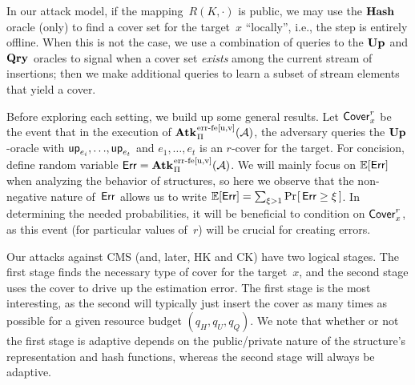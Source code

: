\noindent
In our attack model, if the mapping~$R(K,\cdot)$ is public, we may use the $\textup{\textbf{Hash}}\hspace{0.5pt}$ oracle (only) to find a cover set for the target~$x$ ``locally'', i.e., the step is entirely offline.  When this is not the case, we use a combination of queries to the $\textup{\textbf{Up}}\hspace{0.5pt}$ and $\textup{\textbf{Qry}}\hspace{0.5pt}$ oracles to signal when a cover set \emph{exists} among the current stream of insertions; then we make additional queries to learn a subset of stream elements that yield a cover. 

Before exploring each setting, we build up some general results. 
Let $\mathsf{Cover}^{r}_{x}$ be the event that in the execution of $\ExpErrFe{\struct}{\advA}{u,v}$, the adversary queries the $\textup{\textbf{Up}}\hspace{0.5pt}$-oracle with $\mathsf{up}_{e_i},{\dots},\mathsf{up}_{e_t}$ and $e_1,{\dots},e_t$ is an $r$-cover for the target.  For concision, define random variable $\rverr=\ExpErrFe{\struct}{\advA}{u,v}$.  We will mainly focus on $\mathbb{E}[\mathsf{Err}]$ when analyzing the behavior of structures, so here we observe that the non-negative nature of~$\mathsf{Err}$ allows us to write $\mathbb{E}[\mathsf{Err}]=\sum_{\xi > 1} \Pr\hspace{-1pt}\left[\,\mathsf{Err} \geq \xi\,\right]$.  In determining the needed probabilities, it will be beneficial to condition on $\mathsf{Cover}^{r}_{x}$, 
as this event (for particular values of~$r$) will be crucial for creating errors. 


Our attacks against CMS (and, later, HK and CK) have two logical stages.  The first stage finds the necessary type of cover for the target~$x$, and the second stage uses the cover to drive up the estimation error.  The first stage is the most interesting, as the second will typically just insert the cover as many times as possible for a given resource budget $(q_H,q_U,q_Q)$.  We note that whether or not the first stage is adaptive depends on the public/private nature of the structure's representation and hash functions, whereas the second stage will always be adaptive.  

